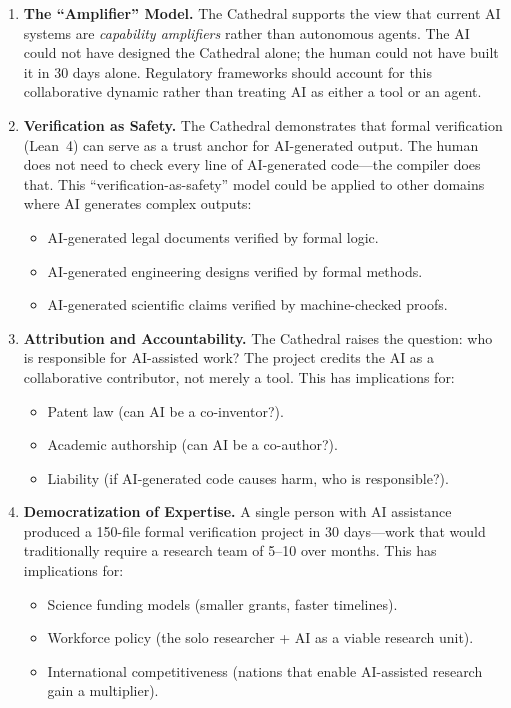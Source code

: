 \documentclass[11pt,a4paper]{article}
\begin{document}
\begin{enumerate}
  \item \textbf{The ``Amplifier'' Model.} The Cathedral supports
    the view that current AI systems are \emph{capability amplifiers}
    rather than autonomous agents. The AI could not have designed the
    Cathedral alone; the human could not have built it in 30 days
    alone. Regulatory frameworks should account for this collaborative
    dynamic rather than treating AI as either a tool or an agent.

  \item \textbf{Verification as Safety.} The Cathedral demonstrates
    that formal verification (Lean~4) can serve as a trust anchor
    for AI-generated output. The human does not need to check every
    line of AI-generated code---the compiler does that. This
    ``verification-as-safety'' model could be applied to other
    domains where AI generates complex outputs:
    \begin{itemize}
      \item AI-generated legal documents verified by formal logic.
      \item AI-generated engineering designs verified by formal
        methods.
      \item AI-generated scientific claims verified by machine-checked
        proofs.
    \end{itemize}

  \item \textbf{Attribution and Accountability.} The Cathedral raises
    the question: who is responsible for AI-assisted work? The
    project credits the AI as a collaborative contributor, not merely
    a tool. This has implications for:
    \begin{itemize}
      \item Patent law (can AI be a co-inventor?).
      \item Academic authorship (can AI be a co-author?).
      \item Liability (if AI-generated code causes harm, who is
        responsible?).
    \end{itemize}

  \item \textbf{Democratization of Expertise.} A single person with
    AI assistance produced a 150-file formal verification project in
    30 days---work that would traditionally require a research team
    of 5--10 over months. This has implications for:
    \begin{itemize}
      \item Science funding models (smaller grants, faster timelines).
      \item Workforce policy (the solo researcher + AI as a viable
        research unit).
      \item International competitiveness (nations that enable
        AI-assisted research gain a multiplier).
    \end{itemize}
\end{enumerate}
\end{document}
